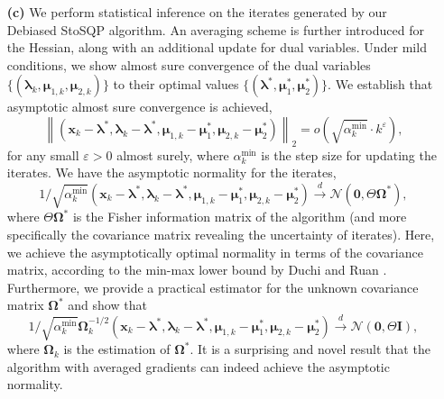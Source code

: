 \documentclass[aos]{imsart}
\numberwithin{equation}{section}
\theoremstyle{plain}
\begin{document}
\begin{enumerate}
    \item[\textbf{(c)}] 
    We perform statistical inference on the iterates generated by our Debiased StoSQP algorithm. 
    An averaging scheme is further introduced for the Hessian, along with an additional update for dual variables. 
    Under mild conditions, we show almost sure convergence of the dual variables $\{(\bm{\lambda}_{k}, \bm{\mu}_{1,k}, \bm{\mu}_{2,k})\}$ to their optimal values $\{(\bm{\lambda}^{*}, \bm{\mu}_{1}^{*}, \bm{\mu}_{2}^{*})\}$.  
    We establish that asymptotic almost sure convergence is achieved, 
    $$ \left\| (\bm{x}_k - \bm{\lambda}^{*}, \bm{\lambda}_{k} - \bm{\lambda}^{*}, \bm{\mu}_{1,k} - \bm{\mu}_1^{*}, \bm{\mu}_{2,k} - \bm{\mu}_2^{*}) \right\|_2 = o\left( \sqrt{\alpha_k^{\text{min}}} \cdot k^{\varepsilon} \right) ,$$ 
    for any small $\varepsilon > 0$ almost surely, where $\alpha_k^{\text{min}}$ is the step size for updating the iterates. 
    We have the asymptotic normality for the iterates, 
    $$ 1/\sqrt{\alpha_k^{\text{min}}}(\bm{x}_k - \bm{\lambda}^{*}, \bm{\lambda}_{k} - \bm{\lambda}^{*}, \bm{\mu}_{1,k} - \bm{\mu}_1^{*}, \bm{\mu}_{2,k} - \bm{\mu}_2^{*}) \stackrel{d}{\longrightarrow} \mathcal{N} \left( \bm{0}, \Theta \bm{\Omega}^{*} \right) ,$$ 
    where $\Theta \bm{\Omega}^{*}$ is the Fisher information matrix of the algorithm (and more specifically the covariance matrix revealing the uncertainty of iterates). 
    Here, we achieve the asymptotically optimal normality in terms of the covariance matrix, according to the min-max lower bound by Duchi and Ruan \cite{duchi2021asymptotic}. 
    Furthermore, we provide a practical estimator for the unknown covariance matrix $ \bm{\Omega}^{*}$ and show that 
    $$ 1/\sqrt{\alpha_k^{\text{min}}} \bm{\Omega}_k^{-1/2}(\bm{x}_k - \bm{\lambda}^{*}, \bm{\lambda}_{k} - \bm{\lambda}^{*}, \bm{\mu}_{1,k} - \bm{\mu}_1^{*}, \bm{\mu}_{2,k} - \bm{\mu}_2^{*}) \stackrel{d}{\longrightarrow} \mathcal{N} \left( \bm{0}, \Theta \bm{I} \right) ,$$ 
    where $\bm{\Omega}_k$ is the estimation of $\bm{\Omega}^{*}$. 
    It is a surprising and novel result that the algorithm with averaged gradients can indeed achieve the asymptotic normality.
\end{enumerate}
\end{document}

